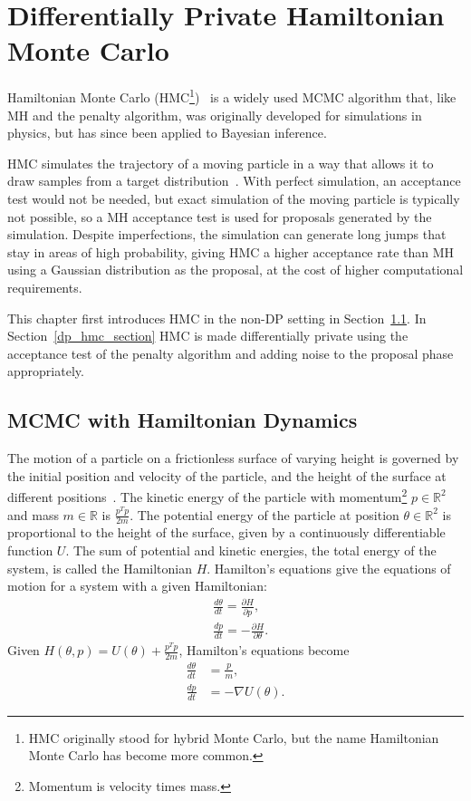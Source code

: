 \documentclass[english,twoside,openright]{HYgraduMLDS}
\newcommand{\R}{\mathbb{R}}
\begin{document}
\chapter{Differentially Private Hamiltonian Monte Carlo}\label{hmc_chapter}

Hamiltonian Monte Carlo (HMC\footnote{
    HMC originally stood for hybrid Monte Carlo, 
    but the name Hamiltonian Monte Carlo has become more common.
})~\cite{DKP87, neal2012mcmc} is a widely used MCMC algorithm that, like
MH and the penalty algorithm, was originally developed
for simulations in physics, but has since been applied to
Bayesian inference. 

HMC simulates the trajectory of a moving particle in a way 
that allows it to draw samples from a target distribution~\cite{neal2012mcmc}. 
With perfect simulation,
an acceptance test would not be needed, but exact simulation of the moving particle 
is typically not possible, so a MH acceptance test is used
for proposals generated by the simulation. Despite imperfections, the simulation can generate long jumps
that stay in areas of high probability, giving HMC a higher acceptance rate 
than MH using a Gaussian distribution as the proposal, at the
cost of higher computational requirements.

This chapter first introduces HMC in the non-DP setting in Section~\ref{hmc_basics_section}.
In Section~\ref{dp_hmc_section} HMC is made differentially private using the
acceptance test of the penalty algorithm and adding noise to the proposal phase 
appropriately.

\section{MCMC with Hamiltonian Dynamics}\label{hmc_basics_section}

The motion of a particle on a frictionless surface of varying height is governed 
by the initial position and velocity of the particle, and the height of the 
surface at different positions~\cite{neal2012mcmc}. 
The kinetic energy of the particle with 
momentum\footnote{Momentum is velocity times mass.}
\(p \in \R^{2}\) and mass \(m \in \R\) is \(\frac{p^{T}p}{2m}\). The potential energy of the particle
at position \(\theta \in \R^{2}\) is proportional to the height of the surface, given by
a continuously differentiable function \(U\).
The sum of potential and kinetic energies, the total 
energy of the system, is called the Hamiltonian \(H\). Hamilton's equations 
give the equations of motion for a system with a given Hamiltonian:
\begin{align*}
    &\frac{d\theta}{dt} = \frac{\partial H}{\partial p},\\
    &\frac{dp}{dt} = -\frac{\partial H}{\partial \theta}.
\end{align*}
Given \(H(\theta, p) = U(\theta) + \frac{p^{T}p}{2m}\), Hamilton's equations become
\begin{align*}
    \frac{d\theta}{dt} &= \frac{p}{m}, \\
    \frac{dp}{dt} &= -\nabla U(\theta).
\end{align*}
\end{document}
